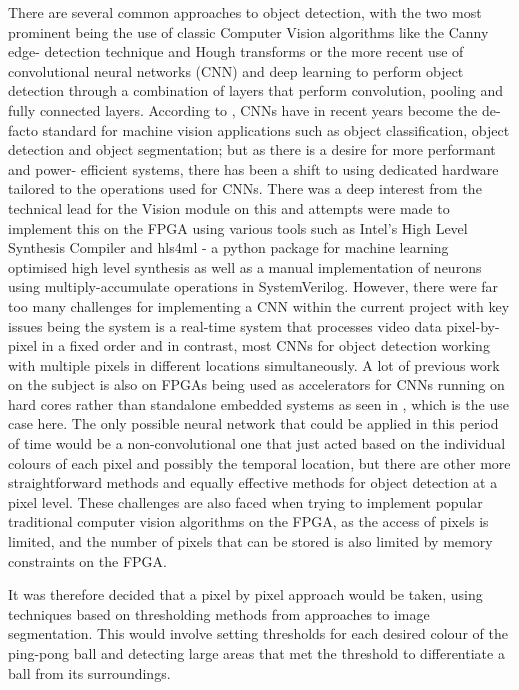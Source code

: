 \documentclass[a4paper]{article}
\begin{document}
There are several common approaches to object detection, with the two most 
prominent being the use of classic Computer Vision algorithms like the Canny edge-
detection technique and Hough transforms or the more recent use of convolutional
neural networks (CNN) and deep learning to perform object detection through a 
combination of layers that perform convolution, pooling and fully connected layers. 
According to \cite{DBLP:journals/corr/abs-1806-01683}, CNNs have in recent years 
become the de-facto standard for machine vision applications such as object 
classification, object detection and object segmentation; but as there is a desire 
for more performant and power- efficient systems, there has been a shift to 
using dedicated hardware tailored to the operations used for CNNs. There was a 
deep interest from the technical lead for the Vision module on this and attempts
were made to implement this on the FPGA using various tools such as Intel's High 
Level Synthesis Compiler \cite{IntelHLS} and hls4ml - a python package for machine learning 
optimised high level synthesis \cite{HLS4ML} as well as a manual implementation of neurons using
multiply-accumulate operations in SystemVerilog. 
However, there were far too many challenges for implementing a CNN within the 
current project with key issues being the system is a real-time system that 
processes video data pixel-by-pixel in a fixed order and in contrast, most CNNs for object 
detection working with multiple pixels in different locations simultaneously. 
A lot of previous work on the subject is also on FPGAs being used as accelerators for 
CNNs running on hard cores rather than standalone embedded systems as seen in \cite{DBLP:journals/corr/abs-1806-01683}
, which is the use case here. The only possible neural network that could be applied in this period of time
would be a non-convolutional one that just acted based on the individual colours of each pixel
and possibly the temporal location, but there are other more straightforward methods 
and equally effective methods for object detection at a pixel level. 
These challenges are also faced when trying to implement popular traditional computer vision 
algorithms on the FPGA, as the access of pixels is limited, and the number of pixels that can be
stored is also limited by memory constraints on the FPGA. 

It was therefore decided that a pixel by pixel approach would be taken, using techniques
based on thresholding methods from approaches to image segmentation. This would
involve setting thresholds for each desired colour of the ping-pong ball and detecting large 
areas that met the threshold to differentiate a ball from its surroundings. 
\end{document}
